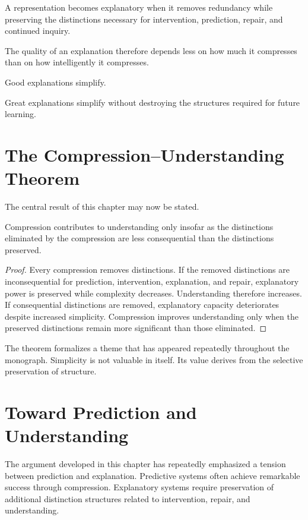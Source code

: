 \documentclass[11pt,oneside,openany]{book}
\begin{document}
A representation becomes explanatory when it removes redundancy while preserving the distinctions necessary for intervention, prediction, repair, and continued inquiry.

The quality of an explanation therefore depends less on how much it compresses than on how intelligently it compresses.

Good explanations simplify.

Great explanations simplify without destroying the structures required for future learning.

\section{The Compression–Understanding Theorem}

The central result of this chapter may now be stated.

\begin{theorem}

Compression contributes to understanding only insofar as the distinctions eliminated by the compression are less consequential than the distinctions preserved.

\end{theorem}

\begin{proof}

Every compression removes distinctions. If the removed distinctions are inconsequential for prediction, intervention, explanation, and repair, explanatory power is preserved while complexity decreases. Understanding therefore increases. If consequential distinctions are removed, explanatory capacity deteriorates despite increased simplicity. Compression improves understanding only when the preserved distinctions remain more significant than those eliminated.

\end{proof}

The theorem formalizes a theme that has appeared repeatedly throughout the monograph. Simplicity is not valuable in itself. Its value derives from the selective preservation of structure.

\section{Toward Prediction and Understanding}

The argument developed in this chapter has repeatedly emphasized a tension between prediction and explanation. Predictive systems often achieve remarkable success through compression. Explanatory systems require preservation of additional distinction structures related to intervention, repair, and understanding.
\end{document}
